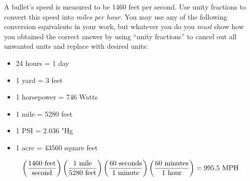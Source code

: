 

A bullet's speed is measured to be 1460 feet per second.  Use unity fractions to convert this speed into {\it miles per hour}.  You may use any of the following conversion equivalents in your work, but whatever you do you {\it must} show how you obtained the correct answer by using ``unity fractions'' to cancel out all unwanted units and replace with desired units:

\begin{itemize}
\item{} 24 hours = 1 day
\vskip 5pt
\item{} 1 yard = 3 feet
\vskip 5pt
\item{} 1 horsepower = 746 Watts
\vskip 5pt
\item{} 1 mile = 5280 feet
\vskip 5pt
\item{} 1 PSI = 2.036 "Hg
\vskip 5pt
\item{} 1 acre = 43560 square feet
\end{itemize}









$$\left(1460 \hbox{ feet} \over \hbox{second} \right) \left(1 \hbox{ mile} \over 5280 \hbox{ feet}\right) \left(60 \hbox{ seconds} \over 1 \hbox{ minute}\right) \left(60 \hbox{ minutes} \over 1 \hbox{ hour}\right) = 995.5 \hbox{ MPH}$$
 










